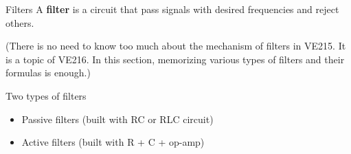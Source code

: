 \documentclass{beamer}
\begin{document}
\begin{frame}{Filters}
A \textbf{filter} is a circuit that pass signals with desired frequencies and reject others.

\begin{small}
    (There is no need to know too much about the mechanism of filters in VE215. It is a topic of VE216. In this section, memorizing various types of filters and their formulas is enough.)
\end{small}

\vspace{0.5cm}

Two types of filters
\begin{itemize}
    \item Passive filters (built with RC or RLC circuit)
    \item Active filters (built with R + C + op-amp)
\end{itemize}


\end{frame}


\end{document}
